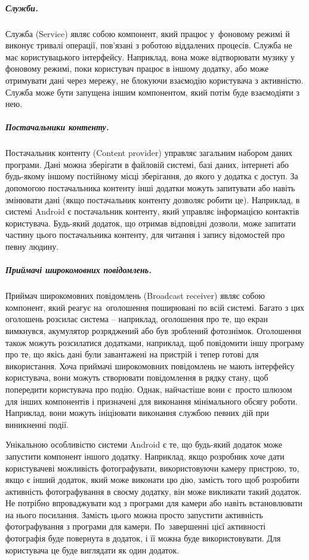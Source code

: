 \documentclass[../main.tex]{subfiles}
\begin{document}
\subparagraph{Служби.}
Служба (Service) являє собою компонент, який працює у~фоновому режимі й виконує тривалі операції, пов'язані з роботою віддалених процесів. Служба не має користувацького інтерфейсу. Наприклад, вона може відтворювати музику у фоновому режимі, поки користувач працює в іншому додатку, або може отримувати дані через мережу, не блокуючи взаємодію користувача з активністю. Служба може бути запущена іншим компонентом, який потім буде взаємодіяти з нею.

\subparagraph{Постачальники контенту.}
Постачальник контенту (Content provider) управляє загальним набором даних програми. Дані можна зберігати в файловій системі, базі даних, інтернеті або будь-якому іншому постійному місці зберігання, до якого у додатка є доступ. За допомогою постачальника контенту інші додатки можуть запитувати або навіть змінювати дані (якщо постачальник контенту дозволяє робити це). Наприклад, в системі Android є постачальник контенту, який управляє інформацією контактів користувача. Будь-який додаток, що отримав відповідні дозволи, може запитати частину цього постачальника контенту, для читання і запису відомостей про певну людину.

\subparagraph{Приймачі широкомовних повідомлень.}
Приймач широкомовних повідомлень (Broadcast receiver) являє собою компонент, який реагує на~оголошення поширювані по всій системі. Багато з цих оголошень розсилає система -- наприклад, оголошення про те, що екран вимкнувся, акумулятор розряджений або був зроблений фотознімок. Оголошення також можуть розсилатися додатками, наприклад, щоб повідомити іншу програму про те, що якісь дані були завантажені на пристрій і тепер готові для використання. Хоча приймачі широкомовних повідомлень не мають інтерфейсу користувача, вони можуть створювати повідомлення в рядку стану, щоб попередити користувача про подію. Однак, найчастіше вони є~просто шлюзом для інших компонентів і призначені для виконання мінімального обсягу роботи. Наприклад, вони можуть ініціювати виконання службою певних дій при виникненні події.

Унікальною особливістю системи Android є те, що будь-який додаток може запустити компонент іншого додатку. Наприклад, якщо розробник хоче дати користувачеві можливість фотографувати, використовуючи камеру пристрою, то, якщо є інший додаток, який може виконати цю дію, замість того щоб розробити активність фотографування в своєму додатку, він може викликати такий додаток. Не потрібно впроваджувати код з програми для камери або навіть встановлювати на нього посилання. Замість цього можна просто запустити активність фотографування з програми для камери. По~завершенні цієї активності фотографія буде повернута в додаток, і її можна буде використовувати. Для користувача це буде виглядати як один додаток.
\end{document}

